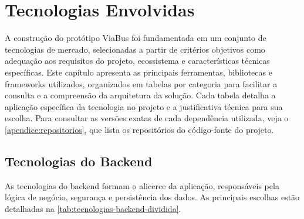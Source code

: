 \chapter{Tecnologias Envolvidas} \label{cha:tecnologias}

A construção do protótipo ViaBus foi fundamentada em um conjunto de tecnologias de mercado, selecionadas a partir de critérios objetivos como adequação aos requisitos do projeto, ecossistema e características técnicas específicas. Este capítulo apresenta as principais ferramentas, bibliotecas e frameworks utilizados, organizados em tabelas por categoria para facilitar a consulta e a compreensão da arquitetura da solução. Cada tabela detalha a aplicação específica da tecnologia no projeto e a justificativa técnica para sua escolha. Para consultar as versões exatas de cada dependência utilizada, veja o \autoref{apendice:repositorios}, que lista os repositórios do código-fonte do projeto.

\section{Tecnologias do Backend}

As tecnologias do backend formam o alicerce da aplicação, responsáveis pela lógica de negócio, segurança e persistência dos dados. As principais escolhas estão detalhadas na \autoref{tab:tecnologias-backend-dividida}.

